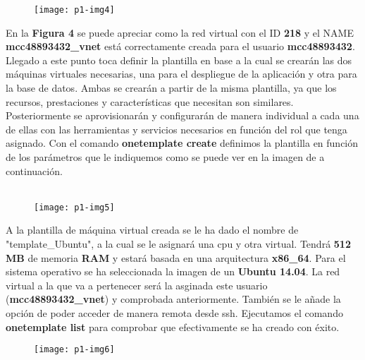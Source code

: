 \documentclass[10pt]{article}
\begin{document}
\begin{figure}[H]
	\begin{center}
 		\texttt{[image: p1-img4]}
	\end{center} 
\end{figure}


En la \textbf{Figura 4} se puede apreciar como la red virtual con el ID \textbf{218} y el NAME \textbf{mcc48893432\_vnet} está correctamente creada para el usuario \textbf{mcc48893432}. Llegado a este punto toca definir la plantilla en base a la cual se crearán las dos máquinas virtuales necesarias, una para el despliegue de la aplicación y otra para la base de datos. Ambas se crearán a partir de la misma plantilla, ya que los recursos, prestaciones y características que necesitan son similares. Posteriormente se aprovisionarán y configurarán de manera individual a cada una de ellas con las herramientas y servicios necesarios en función del rol que tenga asignado. Con el comando \textbf{onetemplate create} definimos la plantilla en función de los parámetros que le indiquemos como se puede ver en la imagen de a continuación. \\ \\

\begin{figure}[H]
	\begin{center}
 		\texttt{[image: p1-img5]}
	\end{center} 
\end{figure}

A la plantilla de máquina virtual creada se le ha dado el nombre de "template\_Ubuntu", a la cual se le asignará una cpu y otra virtual. Tendrá \textbf{512 MB} de memoria \textbf{RAM} y estará basada en una arquitectura \textbf{x86\_64}. Para el sistema operativo se ha seleccionada la imagen de un \textbf{Ubuntu 14.04}. La red virtual a la que va a pertenecer será la asginada este usuario (\textbf{mcc48893432\_vnet}) y comprobada anteriormente. También se le añade la opción de poder acceder de manera remota desde ssh. Ejecutamos el comando \textbf{onetemplate list} para comprobar que efectivamente se ha creado con éxito. \\

\begin{figure}[H]
	\begin{center}
 		\texttt{[image: p1-img6]}
	\end{center} 
\end{figure}
\end{document}
